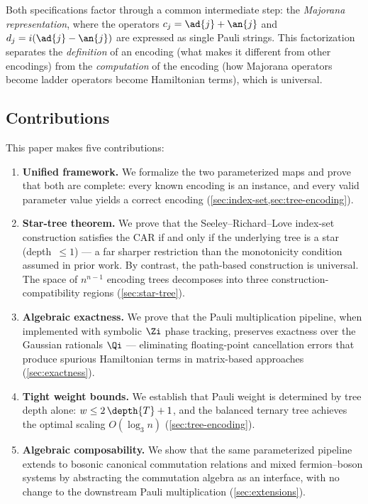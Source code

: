 Both specifications factor through a common intermediate step: the
\emph{Majorana representation}, where the operators $c_j = \ad{j} +
\an{j}$ and $d_j = i(\ad{j} - \an{j})$ are expressed as single Pauli
strings.  This factorization separates the \emph{definition} of an
encoding (what makes it different from other encodings) from the
\emph{computation} of the encoding (how Majorana operators become ladder
operators become Hamiltonian terms), which is universal.

\subsection{Contributions}

This paper makes five contributions:

\begin{enumerate}
  \item \textbf{Unified framework.}  We formalize the two parameterized
    maps and prove that both are complete: every known encoding is an
    instance, and every valid parameter value yields a correct encoding
    (\cref{sec:index-set,sec:tree-encoding}).

  \item \textbf{Star-tree theorem.}  We prove that the
    Seeley--Richard--Love index-set construction satisfies the CAR if
    and only if the underlying tree is a star (depth~$\le 1$) --- a far
    sharper restriction than the monotonicity condition assumed in prior
    work.  By contrast, the path-based construction is universal.  The
    space of $n^{n-1}$ encoding trees decomposes into three
    construction-compatibility regions (\cref{sec:star-tree}).

  \item \textbf{Algebraic exactness.} We prove that the Pauli
    multiplication pipeline, when implemented with symbolic $\Zi$ phase
    tracking, preserves exactness over the Gaussian rationals $\Qi$ ---
    eliminating floating-point cancellation errors that produce spurious
    Hamiltonian terms in matrix-based approaches
    (\cref{sec:exactness}).

  \item \textbf{Tight weight bounds.}  We establish that Pauli
    weight is determined by tree depth alone:
    $w \le 2\,\depth{T} + 1$, and the balanced ternary tree achieves
    the optimal scaling $O(\log_3 n)$ (\cref{sec:tree-encoding}).

  \item \textbf{Algebraic composability.}  We show that the same
    parameterized pipeline extends to bosonic canonical commutation
    relations and mixed fermion--boson systems by abstracting the
    commutation algebra as an interface, with no change to the
    downstream Pauli multiplication (\cref{sec:extensions}).
\end{enumerate}

